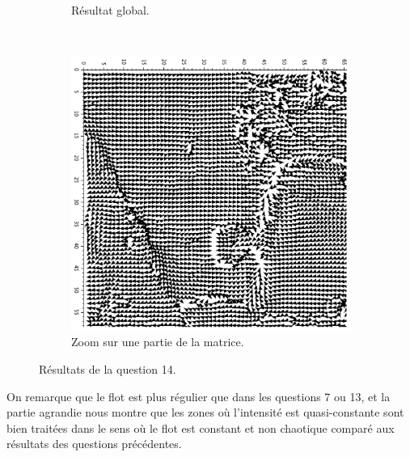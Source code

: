 \begin{enumerate}[questions, start=13]
\begin{figure}
\begin{subfigure}{.6\textwidth}
  \caption{Résultat global.}
  \end{subfigure} \\
  \begin{subfigure}{.6\textwidth}
  \includegraphics[width=\textwidth]{img/q14-results-zoom}
  \caption{Zoom sur une partie de la matrice.}
  \end{subfigure}
\caption{Résultats de la question 14.\label{fig:q14-results}}
\end{figure}
On remarque que le flot est plus régulier que dans les questions 7 ou 13, et la partie agrandie nous montre que les zones où l'intensité est quasi-constante sont bien traitées dans le sens où le flot est constant et non \og{}chaotique\fg{} comparé aux résultats des questions précédentes.
\end{enumerate}